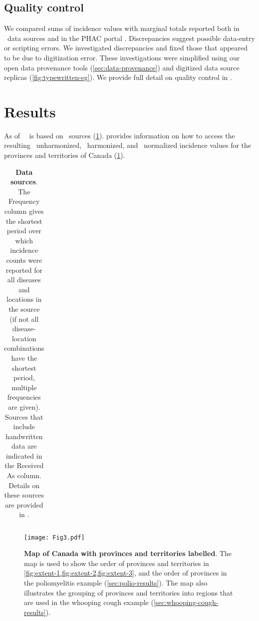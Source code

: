 \documentclass[12pt]{article}
\begin{document}
\subsection{Quality control}\label{sec:quality-control}

We compared sums of incidence values with marginal totals reported both in \datacronym\ data sources and in the PHAC portal \cite{totten2019updates}. Discrepancies suggest possible data-entry or scripting errors. We investigated discrepancies and fixed those that appeared to be due to digitization error. These investigations were simplified using our open data provenance tools (\cref{sec:data-provenance}) and digitized data source replicas (\cref{fig:typewritten-eg}). We provide full detail on quality control in .

\section{Results}\label{sec:results}

As of \asofnow\ \datacronym\ is based on \ sources (\cref{tab:sources-table}).  provides information on how to access the resulting \ unharmonized, \ harmonized, and \ normalized incidence values for the provinces and territories of Canada (\cref{fig:map}).

\begin{table}[!ht]
  \centering
  \caption{\textbf{Data sources}. The Frequency column gives the shortest period over which incidence counts were reported for all diseases and locations in the source (if not all disease-location combinations have the shortest period, multiple frequencies are given). Sources that include handwritten data are indicated in the Received As column. Details on these sources are provided in .} 
  \begin{tabular}{ll>{\raggedright\arraybackslash}p{0.11\linewidth}>{\raggedright\arraybackslash}p{0.25\linewidth}>{\raggedright\arraybackslash}p{0.2\linewidth}}  

\end{tabular}
\label{tab:sources-table}
\end{table}

\begin{figure}[!ht]
  \texttt{[image: Fig3.pdf]}
  \caption{\textbf{Map of Canada with provinces and territories labelled}. The map is used to show the order of provinces and territories in \cref{fig:extent-1,fig:extent-2,fig:extent-3}, and the order of provinces in the poliomyelitis example (\cref{sec:polio-results}). The map also illustrates the grouping of provinces and territories into regions that are used in the whooping cough example (\cref{sec:whooping-cough-results}).}
  \label{fig:map}
\end{figure}
\end{document}
